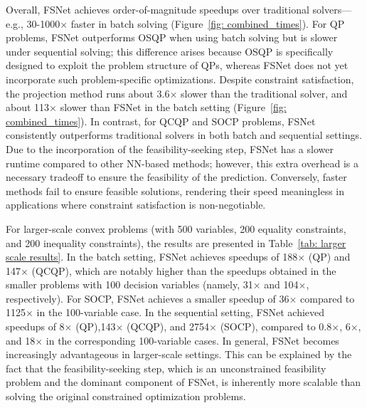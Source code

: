 \documentclass{article}
\begin{document}
Overall, FSNet achieves order-of-magnitude speedups over traditional solvers---e.g., 30-1000$\times$ faster in batch solving (Figure~\ref{fig: combined_times}).
For QP problems, FSNet outperforms OSQP when using batch solving but is slower under sequential solving; this difference arises because OSQP is specifically designed to exploit the problem structure of QPs, whereas FSNet does not yet incorporate such problem-specific optimizations.
Despite constraint satisfaction, the projection method runs about 3.6$\times$ slower than the traditional solver, and about 113$\times$ slower than FSNet in the batch setting (Figure~\ref{fig: combined_times}).
In contrast, for QCQP and SOCP problems, FSNet consistently outperforms traditional solvers in both batch and sequential settings.
Due to the incorporation of the feasibility-seeking step, FSNet has a slower runtime compared to other NN-based methods; however, this extra overhead is a necessary tradeoff to ensure the feasibility of the prediction.
Conversely, faster methods fail to ensure feasible solutions, rendering their speed meaningless in applications where constraint satisfaction is non-negotiable.


For larger-scale convex problems (with 500 variables, 200 equality constraints, and 200 inequality constraints), the results are presented in Table~\ref{tab: larger scale results}. In the batch setting, FSNet achieves speedups of 188$\times$ (QP) and 147$\times$ (QCQP), which are notably higher than the speedups obtained in the smaller problems with 100 decision variables (namely, 31$\times$ and 104$\times$, respectively). 
For SOCP, FSNet achieves a smaller speedup of 36$\times$ compared to 1125$\times$ in the 100-variable case. 
In the sequential setting, FSNet achieved speedups of 8$\times$ (QP),143$\times$ (QCQP), and 2754$\times$ (SOCP), compared to 0.8$\times$, 6$\times$, and 18$\times$ in the corresponding 100-variable cases. In general, FSNet becomes increasingly advantageous in larger-scale settings. This can be explained by the fact that the feasibility-seeking step, which is an unconstrained feasibility problem and the dominant component of FSNet, is inherently more scalable than solving the original constrained optimization problems.
\end{document}
